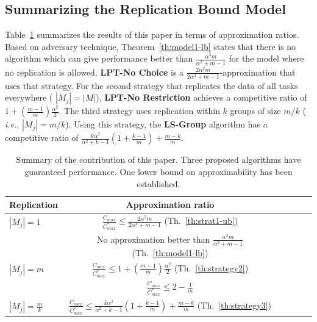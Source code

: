 \documentclass[twocolumn]{svjour3}
\begin{document}
\subsection{Summarizing the Replication Bound Model}\label{sec7}
Table~\ref{tab:template} summarizes the results of this paper in terms
of approximation ratios. Based on adversary technique,
Theorem~\ref{th:model1-lb} states that there is no algorithm which can
give performance better than $\frac{\alpha^{2}m }{\alpha^{2} + m-1}$ for the model where no
replication is allowed. {\bf LPT-No Choice} is a
$\frac{2\alpha^{2}m}{2\alpha^{2}+ m-1}$-approximation that uses that
strategy. For the second strategy that replicates the data of all
tasks everywhere ( $|M_j| = |M|$), {\bf LPT-No Restriction} achieves a
competitive ratio of $1 + (\frac{m-1}{m})\frac{\alpha^{2}}{2}$.  The
third strategy uses replication within $k$ groups of size $m/k$ ({\em
  i.e.}, $|M_j| = m/k$). Using this strategy, the {\bf LS-Group}
algorithm has a competitive ratio of
$\frac{k\alpha^{2}}{\alpha^{2}+k-1}\left( 1+ {\frac{k-1}{m}} \right) +
{\frac{m-k}{m}}$.



\begin{table}[ht]
  \centering
  \begin{tabular}{|l|c|c|c|c|c|}
    \hline
    Replication & Approximation ratio  \\
    \hline
    $|M_j|=1$ & $\frac{C_{max}}{C_{max}^{*}}\leq \frac{2\alpha^{2}m}{2\alpha^{2}+ m-1}$ (Th.~\ref{th:strat1-ub})  \\
    & No approximation better than $\frac{\alpha^{2}m }{\alpha^{2} + m-1}$ (Th.~\ref{th:model1-lb})   \\
    
    \hline
    $|M_j|=m$ & $\frac{C_{max}}{C_{max}^{*}} \leq 1 + (\frac{m-1}{m})\frac{\alpha^{2}}{2}$ (Th.~\ref{th:strategy2})  \\
    & $\frac{C_{max}}{C_{max}^{*}} \leq 2-\frac{1}{m}$ \cite{Graham66}   \\
    \hline
    
    $|M_j|= \frac{m}{k} $ & $\frac{C_{max}}{C_{max}^{*}} \leq \frac{k\alpha^{2}}{\alpha^{2}+k-1} \left(1+ {\frac{k-1}{m}} \right)+ {\frac{m-k}{m}}$ (Th.~\ref{th:strategy3})  \\
    
    \hline
  \end{tabular}
  \caption{Summary of the contribution of this paper.
    Three proposed algorithms have guaranteed performance.
    One lower bound on approximability has been established.}
  \label{tab:template}
\end{table}
\end{document}
